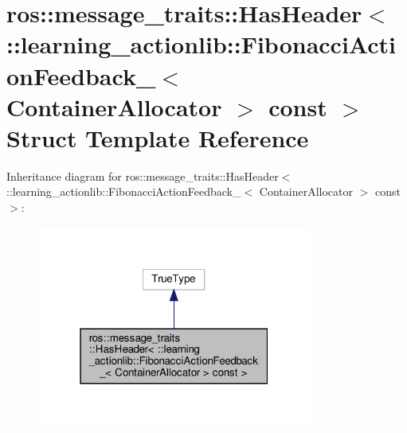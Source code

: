 \hypertarget{structros_1_1message__traits_1_1HasHeader_3_01_1_1learning__actionlib_1_1FibonacciActionFeedbackf8e29cb3f04de72fc0fe43321628c229}{}\section{ros\+:\+:message\+\_\+traits\+:\+:Has\+Header$<$ \+:\+:learning\+\_\+actionlib\+:\+:Fibonacci\+Action\+Feedback\+\_\+$<$ Container\+Allocator $>$ const $>$ Struct Template Reference}
\label{structros_1_1message__traits_1_1HasHeader_3_01_1_1learning__actionlib_1_1FibonacciActionFeedbackf8e29cb3f04de72fc0fe43321628c229}


Inheritance diagram for ros\+:\+:message\+\_\+traits\+:\+:Has\+Header$<$ \+:\+:learning\+\_\+actionlib\+:\+:Fibonacci\+Action\+Feedback\+\_\+$<$ Container\+Allocator $>$ const $>$\+:
\nopagebreak
\begin{figure}[H]
\begin{center}
\leavevmode
\includegraphics[width=256pt]{structros_1_1message__traits_1_1HasHeader_3_01_1_1learning__actionlib_1_1FibonacciActionFeedback007cffd02c6a55b7f464df22ee699890}
\end{center}
\end{figure}


